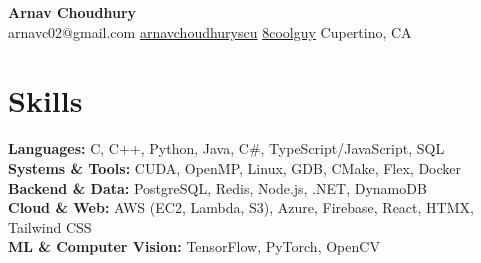 \documentclass[11pt]{article}
\newcommand{\resumeSubHeadingListStart}{\begin{itemize}[leftmargin=0.15in, label={}]}
\newcommand{\resumeSubHeadingListEnd}{\end{itemize}}
\begin{document}

\begin{center}
    \textbf{\Huge Arnav Choudhury} \\ \vspace{3pt}
    \small
    \faMobile \hspace{.5pt}{ (408) 386-1678}
    \textbar{}
    \faAt \hspace{.5pt} {arnavc02@gmail.com}
    	\textbar{}
    \faLinkedinSquare \hspace{.5pt} \href{https://www.linkedin.com/in/arnavchoudhuryscu}{ arnavchoudhuryscu}
    	\textbar{}
    \faGithub \hspace{.5pt} \href{https://github.com/8coolguy}{ 8coolguy}
    	\textbar{}
    \faGlobe \hspace{.5pt} {Cupertino, CA}
\end{center}


\section{Skills}
  \vspace{2pt}
  \resumeSubHeadingListStart
    \small{\item{
        \textbf{Languages:}{ C, C++, Python, Java, C\#, TypeScript/JavaScript, SQL} \\ \vspace{3pt}
        \textbf{Systems \& Tools:}{ CUDA, OpenMP, Linux, GDB, CMake, Flex, Docker} \\ \vspace{3pt}
        \textbf{Backend \& Data:}{ PostgreSQL, Redis, Node.js, .NET, DynamoDB} \\ \vspace{3pt}
        \textbf{Cloud \& Web:}{ AWS (EC2, Lambda, S3), Azure, Firebase, React, HTMX, Tailwind CSS} \\ \vspace{3pt}
        \textbf{ML \& Computer Vision:}{ TensorFlow, PyTorch, OpenCV}
    }}
  \resumeSubHeadingListEnd
\end{document}
